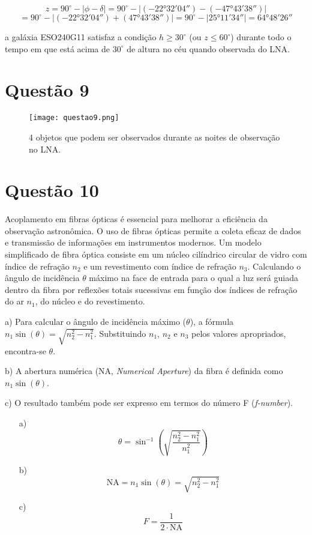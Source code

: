 \documentclass[a4paper, 12pt]{article}
\begin{document}
\[
z = 90^\circ - \left| \phi - \delta \right| 
= 90^\circ - \left| (-22°32'04'') - (-47°43'38'') \right| 
\]
\[
= 90^\circ - \left| (-22°32'04'') + (47°43'38'') \right| 
= 90^\circ - \left| 25°11'34'' \right| 
= 64°48'26''
\]

a galáxia ESO240G11 satisfaz a condição \(h \geq 30^\circ\) (ou \(z \leq 60^\circ\)) durante todo o tempo em que está acima de \(30^\circ\) de altura no céu quando observada do LNA.


\section*{Questão 9}
\begin{figure}[h]
    \centering
    \texttt{[image: questao9.png]}
    \caption{4 objetos que podem ser observados durante as noites de observação no LNA.} %
    \label{fig:questao9}
\end{figure}


\section*{Questão 10}
Acoplamento em fibras ópticas é essencial para melhorar a eficiência da observação astronômica. O uso de fibras ópticas permite a coleta eficaz de dados e transmissão de informações em instrumentos modernos. Um modelo simplificado de fibra óptica consiste em um núcleo cilíndrico circular de vidro com índice de refração \(n_2\) e um revestimento com índice de refração \(n_3\). Calculando o ângulo de incidência \(\theta\) máximo na face de entrada para o qual a luz será guiada dentro da fibra por reflexões totais sucessivas em função dos índices de refração do ar \(n_1\), do núcleo e do revestimento.

a) Para calcular o ângulo de incidência máximo (\(\theta\)), a fórmula \(n_1 \sin(\theta) = \sqrt{n_2^2 - n_1^2}\). Substituindo \(n_1\), \(n_2\) e \(n_3\) pelos valores apropriados, encontra-se  \(\theta\).

b) A abertura numérica (NA, \textit{Numerical Aperture}) da fibra é definida como \(n_1 \sin(\theta)\).

c) O resultado também pode ser expresso em termos do número F (\textit{f-number}).

\begin{enumerate}
    \item[a)]
    \[
    \theta = \sin^{-1}\left(\sqrt{\frac{n_2^2 - n_1^2}{n_1^2}}\right)
    \]
    
    \item[b)]
    \[
    \text{NA} = n_1 \sin(\theta) = \sqrt{n_2^2 - n_1^2}
    \]
    
    \item[c)]
    \[
    F = \frac{1}{2 \cdot \text{NA}}
    \]
\end{enumerate}
\end{document}
